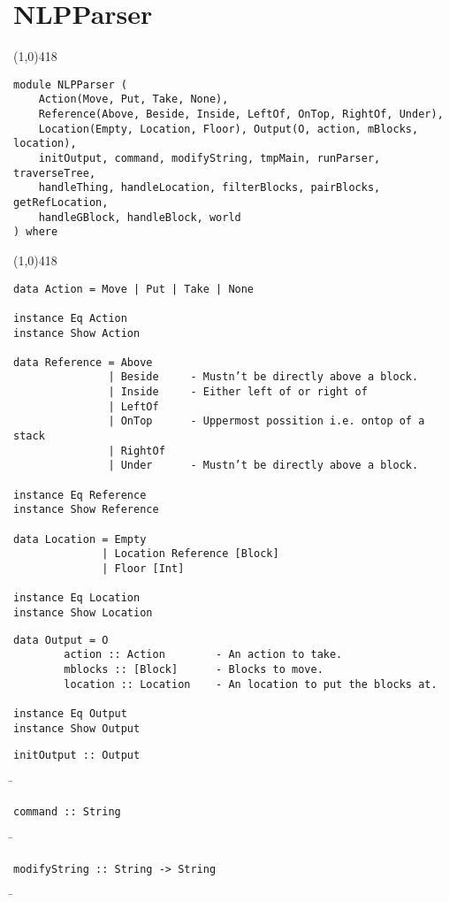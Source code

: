 \section{NLPParser}
\begin{center}
\line(1,0){418}
\end{center}
\begin{verbatim}
module NLPParser (
    Action(Move, Put, Take, None),
    Reference(Above, Beside, Inside, LeftOf, OnTop, RightOf, Under),
    Location(Empty, Location, Floor), Output(O, action, mBlocks, location),
    initOutput, command, modifyString, tmpMain, runParser, traverseTree,
    handleThing, handleLocation, filterBlocks, pairBlocks, getRefLocation,
    handleGBlock, handleBlock, world
) where
\end{verbatim}
\begin{center}
\line(1,0){418}
\end{center}
\begin{verbatim}
data Action = Move | Put | Take | None

instance Eq Action
instance Show Action

data Reference = Above
               | Beside     - Mustn’t be directly above a block.
               | Inside     - Either left of or right of
               | LeftOf
               | OnTop      - Uppermost possition i.e. ontop of a stack
               | RightOf
               | Under      - Mustn’t be directly above a block.

instance Eq Reference
instance Show Reference

data Location = Empty 
              | Location Reference [Block] 
              | Floor [Int]

instance Eq Location
instance Show Location
\end{verbatim}
\newpage
\begin{verbatim}
data Output = O 
        action :: Action        - An action to take.
        mblocks :: [Block]      - Blocks to move. 
        location :: Location    - An location to put the blocks at.

instance Eq Output
instance Show Output
\end{verbatim}
\begin{verbatim}
initOutput :: Output
\end{verbatim}
\begin{tabbing}
\hspace*{1cm}\= \kill
\> 
\end{tabbing}
\begin{verbatim}
command :: String
\end{verbatim}
\begin{tabbing}
\hspace*{1cm}\= \kill
\> 
\end{tabbing}
\begin{verbatim}
modifyString :: String -> String
\end{verbatim}
\begin{tabbing}
\hspace*{1cm}\= \kill
\> 
\end{tabbing}

